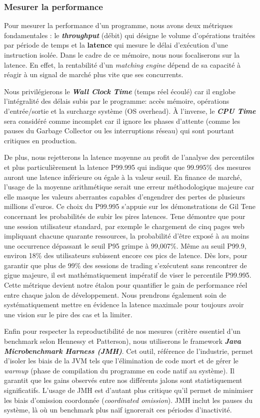 \subsubsection{Mesurer la performance}

Pour mesurer la performance d'un programme, nous avons deux métriques fondamentales : le \textit{\textbf{throughput}} (débit) qui désigne le volume d'opérations traitées par période de temps et la \textbf{latence} qui mesure le délai d'exécution d'une instruction isolée. Dans le cadre de ce mémoire, nous nous focaliserons sur la latence. En effet, la rentabilité d'un \textit{matching engine} dépend de sa capacité à réagir à un signal de marché plus vite que ses concurrents.

Nous privilégierons le \textit{\textbf{Wall Clock Time}} (temps réel écoulé) car il englobe l'intégralité des délais subis par le programme: accès mémoire, opérations d'entrée/sortie et la surcharge système (OS overhead). À l'inverse, le \textit{\textbf{CPU Time}} sera considéré comme incomplet car il ignore les phases d'attente (comme les pauses du Garbage Collector ou les interruptions réseau) qui sont pourtant critiques en production.

De plus, nous rejetterons la latence moyenne au profit de l'analyse des percentiles et plus particulièrement la latence P99.995 qui indique que 99.995\% des mesures auront une latence inférieure ou égale à la valeur seuil. En finance de marché, l'usage de la moyenne arithmétique serait une erreur méthodologique majeure car elle masque les valeurs aberrantes capables d'engendrer des pertes de plusieurs millions d'euros. Ce choix du P99.995 s'appuie sur les démonstrations de Gil Tene concernant les probabilités de subir les pires latences. Tene démontre que pour une session utilisateur standard, par exemple le chargement de cinq pages web impliquant chacune quarante ressources, la probabilité d'être exposé à au moins une occurrence dépassant le seuil P95 grimpe à 99,007\%. Même au seuil P99.9, environ 18\% des utilisateurs subissent encore ces pics de latence. Dès lors, pour garantir que plus de 99\% des sessions de trading s'exécutent sans rencontrer de gigue majeure, il est mathématiquement impératif de viser le percentile P99.995. Cette métrique devient notre étalon pour quantifier le gain de performance réel entre chaque jalon de développement. Nous prendrons également soin de systématiquement mettre en évidence la latence maximale pour toujours avoir une vision sur le pire des cas et la limiter. 

Enfin pour respecter la reproductibilité de nos mesures (critère essentiel d'un benchmark selon Hennessy et Patterson), nous utiliserons le framework \textit{\textbf{Java Microbenchmark Harness (JMH)}}. Cet outil, référence de l'industrie, permet d'isoler les biais de la JVM tels que l'élimination de code mort et de gérer le \textit{warmup} (phase de compilation du programme en code natif au système). Il garantit que les gains observés entre nos différents jalons sont statistiquement significatifs. L'usage de JMH est d'autant plus critique qu'il permet de minimiser les biais d'omission coordonnée (\textit{coordinated omission}). JMH inclut les pauses du système, là où un benchmark plus naïf ignorerait ces périodes d'inactivité.